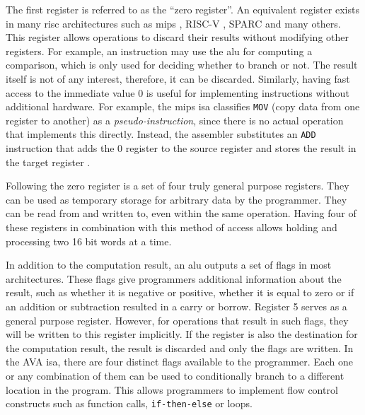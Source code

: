 The first register is referred to as the ``zero register''. An equivalent register exists in many \ac{risc} architectures such as \ac{mips} \cite{mips1995}, RISC-V \cite{riscv_specs}, SPARC \cite{sparc_specs} and many others. This register allows operations to discard their results without modifying other registers. For example, an instruction may use the \ac{alu} for computing a comparison, which is only used for deciding whether to branch or not. The result itself is not of any interest, therefore, it can be discarded. Similarly, having fast access to the immediate value 0 is useful for implementing instructions without additional hardware. For example, the \ac{mips} \ac{isa} classifies \texttt{MOV} (copy data from one register to another) as a \textit{pseudo-instruction}, since there is no actual operation that implements this directly. Instead, the assembler substitutes an \texttt{ADD} instruction that adds the 0 register to the source register and stores the result in the target register \cite{mips1995}.

Following the zero register is a set of four truly general purpose registers. They can be used as temporary storage for arbitrary data by the programmer. They can be read from and written to, even within the same operation. Having four of these registers in combination with this method of access allows holding and processing two 16 bit words at a time.

In addition to the computation result, an \ac{alu} outputs a set of flags in most architectures. These flags give programmers additional information about the result, such as whether it is negative or positive, whether it is equal to zero or if an addition or subtraction resulted in a carry or borrow. Register 5 serves as a general purpose register. However, for operations that result in such flags, they will be written to this register implicitly. If the register is also the destination for the computation result, the result is discarded and only the flags are written. In the AVA \ac{isa}, there are four distinct flags available to the programmer. Each one or any combination of them can be used to conditionally branch to a different location in the program. This allows programmers to implement flow control constructs such as function calls, \texttt{if-then-else} or loops.

